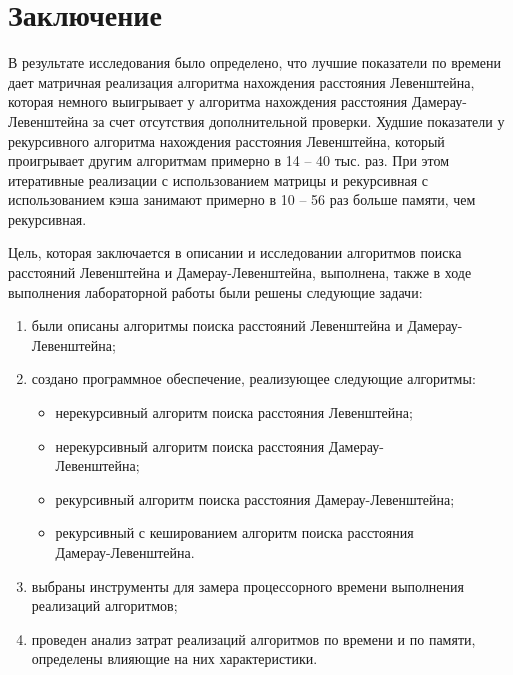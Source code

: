 \chapter*{Заключение}

В результате исследования было определено, что лучшие показатели по времени дает 
матричная реализация алгоритма нахождения расстояния 
Левенштейна, которая немного выигрывает у алгоритма нахождения
расстояния Дамерау-Левенштейна за счет отсутствия дополнительной проверки.
Худшие показатели у рекурсивного  алгоритма нахождения расстояния 
Левенштейна, который проигрывает другим алгоритмам примерно в 
14 -- 40 тыс. раз. При этом итеративные реализации с использованием матрицы и рекурсивная с использованием кэша
занимают примерно в 10 -- 56 раз больше памяти, чем рекурсивная.



Цель, которая заключается в описании и исследовании алгоритмов поиска расстояний Левенштейна и Дамерау-Левенштейна, выполнена, также в ходе выполнения лабораторной 
работы были решены следующие задачи:
\begin{enumerate}[label={\arabic*)}] 
	\item были описаны алгоритмы поиска расстояний Левенштейна и Дамерау-Левенштейна;
	\item создано программное обеспечение, реализующее следующие алгоритмы:
	\begin{itemize}[label=---]
		\item нерекурсивный алгоритм поиска расстояния Левенштейна;
		\item нерекурсивный алгоритм поиска расстояния Дамерау-\\
		Левенштейна;
		\item рекурсивный алгоритм поиска расстояния Дамерау-Левенштейна;
		\item рекурсивный с кешированием алгоритм поиска расстояния \\
		Дамерау-Левенштейна.
	\end{itemize}
	\item выбраны инструменты для замера процессорного времени выполнения реализаций алгоритмов;
	\item проведен анализ затрат реализаций алгоритмов по времени и по памяти, определены влияющие на них характеристики.
\end{enumerate}

